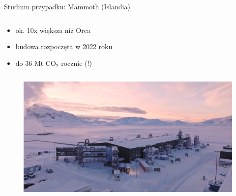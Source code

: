 \begin{columnframe}{Studium przypadku: Mammoth (Islandia)}
    \begin{column}{0.5\textwidth}
        \begin{itemize}
            \item ok. 10x większa niż Orca
            \item budowa rozpoczęta w 2022 roku
            \item do 36 Mt CO$_2$ rocznie (!)
        \end{itemize}
    \end{column}
    \begin{column}{0.5\textwidth}
        \begin{figure}
            \centering
            \includegraphics[width=1.0\textwidth, frame]{images/mammoth_iceland.png}
        \end{figure}
    \end{column}
\end{columnframe}

